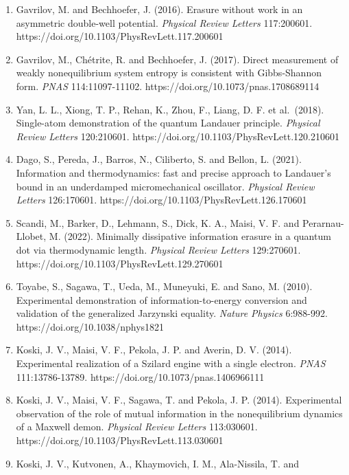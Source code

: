 \documentclass[
  10pt,
]{article}
\newcounter{none} %
\begin{document}
\begin{enumerate}
  test of Landauer's principle in single-bit operations on nanomagnetic
  memory bits. \emph{Science Advances} 2:e1501492.
  https://doi.org/10.1126/sciadv.1501492
\item
  Gavrilov, M. and Bechhoefer, J. (2016). Erasure without work in an
  asymmetric double-well potential. \emph{Physical Review Letters}
  117:200601. https://doi.org/10.1103/PhysRevLett.117.200601
\item
  Gavrilov, M., Chétrite, R. and Bechhoefer, J. (2017). Direct
  measurement of weakly nonequilibrium system entropy is consistent with
  Gibbs-Shannon form. \emph{PNAS} 114:11097-11102.
  https://doi.org/10.1073/pnas.1708689114
\item
  Yan, L. L., Xiong, T. P., Rehan, K., Zhou, F., Liang, D. F. et
  al.~(2018). Single-atom demonstration of the quantum Landauer
  principle. \emph{Physical Review Letters} 120:210601.
  https://doi.org/10.1103/PhysRevLett.120.210601
\item
  Dago, S., Pereda, J., Barros, N., Ciliberto, S. and Bellon, L. (2021).
  Information and thermodynamics: fast and precise approach to
  Landauer's bound in an underdamped micromechanical oscillator.
  \emph{Physical Review Letters} 126:170601.
  https://doi.org/10.1103/PhysRevLett.126.170601
\item
  Scandi, M., Barker, D., Lehmann, S., Dick, K. A., Maisi, V. F. and
  Perarnau-Llobet, M. (2022). Minimally dissipative information erasure
  in a quantum dot via thermodynamic length. \emph{Physical Review
  Letters} 129:270601. https://doi.org/10.1103/PhysRevLett.129.270601
\item
  Toyabe, S., Sagawa, T., Ueda, M., Muneyuki, E. and Sano, M. (2010).
  Experimental demonstration of information-to-energy conversion and
  validation of the generalized Jarzynski equality. \emph{Nature
  Physics} 6:988-992. https://doi.org/10.1038/nphys1821
\item
  Koski, J. V., Maisi, V. F., Pekola, J. P. and Averin, D. V. (2014).
  Experimental realization of a Szilard engine with a single electron.
  \emph{PNAS} 111:13786-13789. https://doi.org/10.1073/pnas.1406966111
\item
  Koski, J. V., Maisi, V. F., Sagawa, T. and Pekola, J. P. (2014).
  Experimental observation of the role of mutual information in the
  nonequilibrium dynamics of a Maxwell demon. \emph{Physical Review
  Letters} 113:030601. https://doi.org/10.1103/PhysRevLett.113.030601
\item
  Koski, J. V., Kutvonen, A., Khaymovich, I. M., Ala-Nissila, T. and

\end{enumerate}
\end{document}
